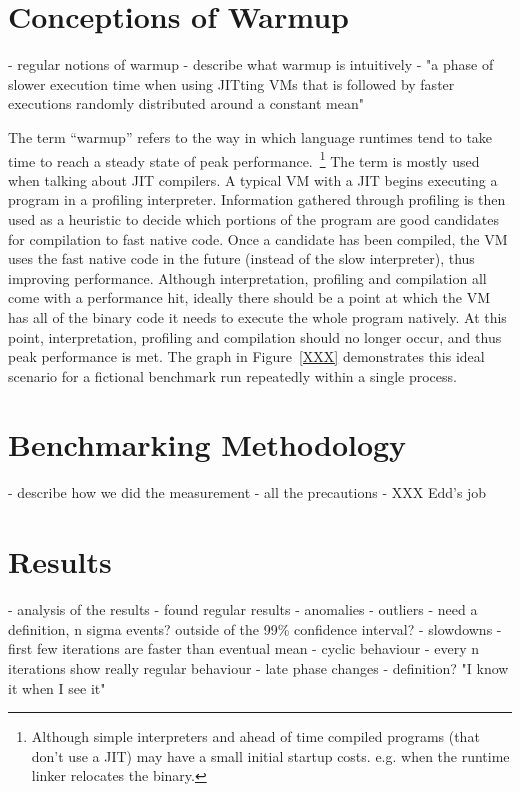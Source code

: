 \documentclass[10pt,preprint]{sigplanconf}
\begin{document}
\section{Conceptions of Warmup}
\label{sec:Conceptions of Warmup}

- regular notions of warmup
  - describe what warmup is intuitively
  - "a phase of slower execution time when using JITting VMs that is followed
    by faster executions randomly distributed around a constant mean"

The term ``warmup'' refers to the way in which language runtimes tend to take
time to reach a steady state of peak performance.~\footnote{Although simple
interpreters and ahead of time compiled programs (that don't use a JIT) may
have a small initial startup costs. e.g. when the runtime linker relocates the
binary.} The term is mostly used when talking about JIT compilers. A typical VM
with a JIT begins executing a program in a profiling interpreter. Information
gathered through profiling is then used as a heuristic to decide which portions
of the program are good candidates for compilation to fast native code. Once a
candidate has been compiled, the VM uses the fast native code in the future
(instead of the slow interpreter), thus improving performance.  Although
interpretation, profiling and compilation all come with a performance hit,
ideally there should be a point at which the VM has all of the binary code it
needs to execute the whole program natively. At this point, interpretation,
profiling and compilation should no longer occur, and thus peak performance is
met. The graph in Figure~\ref{XXX} demonstrates this ideal scenario for a
fictional benchmark run repeatedly within a single process.



\section{Benchmarking Methodology}
\label{sec:Benchmarking Methodology}

- describe how we did the measurement
  - all the precautions
  - XXX Edd's job


\section{Results}
\label{sec:Results}

- analysis of the results
  - found regular results
  - anomalies
  - outliers
    - need a definition, n sigma events? outside of the 99\% confidence interval?
  - slowdowns
    - first few iterations are faster than eventual mean
  - cyclic behaviour
    - every n iterations show really regular behaviour
  - late phase changes
    - definition? "I know it when I see it"
\end{document}
